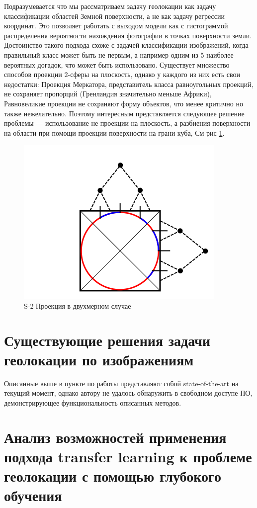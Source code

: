 Подразумевается что мы рассматриваем задачу геолокации как задачу классификации областей Земной поверхности, а не как задачу регрессии координат. Это позволяет работать с выходом модели как с гистограммой распределения вероятности нахождения фотографии в точках поверхности земли.
Достоинство такого подхода схоже с задачей классификации изображений, когда правильный класс может быть не первым, а например одним из 5 наиболее вероятных догадок, что может быть использовано.
Существует множество способов проекции $2$-сферы на плоскость, однако у каждого из них есть свои недостатки:
Проекция Меркатора, представитель класса равноугольных проекций, не сохраняет пропорций (Гренландия значительно меньше Африки), Равновеликие проекции не сохраняют форму объектов, что менее критично но также нежелательно.
Поэтому интересным представляется следующее решение проблемы --- использование не проекции  на плоскость, а разбиения поверхности на области при помощи проекции поверхности на грани куба, См рис \ref{pic:projection}.
\begin{figure}
	\centering
	\includegraphics{img/projection}
	\caption{S-2 Проекция в двухмерном случае}
	\label{pic:projection}
\end{figure}

\section{Существующие решения задачи геолокации по изображениям}

Описанные выше в пункте по работы \cite{} представляют собой state-of-the-art на текущий момент, однако автору не удалось обнаружить в свободном доступе ПО, демонстрирующее функциональность описанных методов. 


\section{Анализ возможностей применения подхода transfer learning к проблеме геолокации с помощью глубокого обучения}



